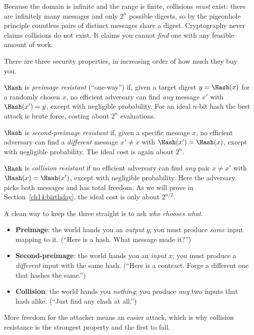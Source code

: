Because the domain is infinite and the range is finite, collisions \emph{must} exist: there are infinitely many messages and only $2^{n}$ possible digests, so by the pigeonhole principle countless pairs of distinct messages share a digest. Cryptography never claims collisions do not exist. It claims you cannot \emph{find} one with any feasible amount of work.

There are three security properties, in increasing order of how much they buy you.

\begin{definition}
\label{ch14:def-preimage}
$\Hash$ is \emph{preimage resistant} (``one-way'') if, given a target digest $y = \Hash(x)$ for a randomly chosen $x$, no efficient adversary can find \emph{any} message $x'$ with $\Hash(x') = y$, except with negligible probability. For an ideal $n$-bit hash the best attack is brute force, costing about $2^{n}$ evaluations.
\end{definition}

\begin{definition}
\label{ch14:def-second}
$\Hash$ is \emph{second-preimage resistant} if, given a specific message $x$, no efficient adversary can find a \emph{different} message $x' \ne x$ with $\Hash(x') = \Hash(x)$, except with negligible probability. The ideal cost is again about $2^{n}$.
\end{definition}

\begin{definition}
\label{ch14:def-collision}
$\Hash$ is \emph{collision resistant} if no efficient adversary can find \emph{any} pair $x \ne x'$ with $\Hash(x) = \Hash(x')$, except with negligible probability. Here the adversary picks both messages and has total freedom. As we will prove in Section~\ref{ch14:birthday}, the ideal cost is only about $2^{n/2}$.
\end{definition}

\begin{intuitionbox}
A clean way to keep the three straight is to ask \emph{who chooses what}.
\begin{itemize}
  \item \textbf{Preimage}: the world hands you an \emph{output} $y$; you must produce \emph{some} input mapping to it. (``Here is a hash. What message made it?'')
  \item \textbf{Second-preimage}: the world hands you an \emph{input} $x$; you must produce a \emph{different} input with the same hash. (``Here is a contract. Forge a different one that hashes the same.'')
  \item \textbf{Collision}: the world hands you \emph{nothing}; you produce \emph{any} two inputs that hash alike. (``Just find any clash at all.'')
\end{itemize}
More freedom for the attacker means an easier attack, which is why collision resistance is the strongest property and the first to fall.
\end{intuitionbox}

